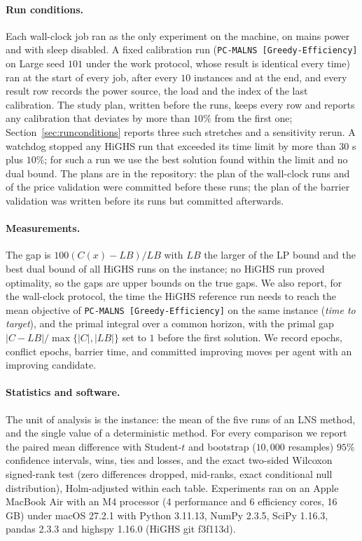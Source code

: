 \documentclass[a4paper,fleqn]{cas-sc}
\newcommand{\pge}{\texttt{PC-MALNS [Greedy-Efficiency]}}
\begin{document}
\paragraph{Run conditions.} Each wall-clock job ran as the only experiment on the machine, on mains power and with sleep disabled. A fixed calibration run (\pge{} on Large seed $101$ under the work protocol, whose result is identical every time) ran at the start of every job, after every $10$ instances and at the end, and every result row records the power source, the load and the index of the last calibration. The study plan, written before the runs, keeps every row and reports any calibration that deviates by more than $10\%$ from the first one; Section~\ref{sec:runconditions} reports three such stretches and a sensitivity rerun. A watchdog stopped any HiGHS run that exceeded its time limit by more than $30$ s plus $10\%$; for such a run we use the best solution found within the limit and no dual bound. The plans are in the repository: the plan of the wall-clock runs and of the price validation were committed before these runs; the plan of the barrier validation was written before its runs but committed afterwards.

\paragraph{Measurements.} The gap is $100 (C(x) - LB)/LB$ with $LB$ the larger of the LP bound and the best dual bound of all HiGHS runs on the instance; no HiGHS run proved optimality, so the gaps are upper bounds on the true gaps. We also report, for the wall-clock protocol, the time the HiGHS reference run needs to reach the mean objective of \pge{} on the same instance (\emph{time to target}), and the primal integral \citep{berthold2013} over a common horizon, with the primal gap $|C - LB|/\max\{|C|, |LB|\}$ set to $1$ before the first solution. We record epochs, conflict epochs, barrier time, and committed improving moves per agent with an improving candidate.

\paragraph{Statistics and software.} The unit of analysis is the instance: the mean of the five runs of an LNS method, and the single value of a deterministic method. For every comparison we report the paired mean difference with Student-$t$ and bootstrap ($10{,}000$ resamples) $95\%$ confidence intervals, wins, ties and losses, and the exact two-sided Wilcoxon signed-rank test (zero differences dropped, mid-ranks, exact conditional null distribution), Holm-adjusted within each table. Experiments ran on an Apple MacBook Air with an M4 processor (4 performance and 6 efficiency cores, 16 GB) under macOS 27.2.1 with Python 3.11.13, NumPy 2.3.5, SciPy 1.16.3, pandas 2.3.3 and highspy 1.16.0 (HiGHS git f3f113d).
\end{document}
